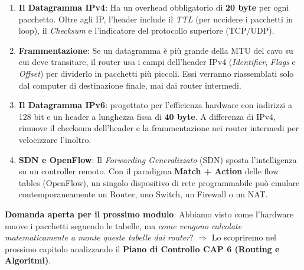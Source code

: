 \documentclass[a4paper,12pt]{report}
\begin{document}
\begin{tcolorbox}[colback=unibolight, colframe=uniboblue, title=\bfseries Concetti chiave del Capitolo 5 (Data Plane), breakable]
\begin{enumerate}
    \item \textbf{Il Datagramma IPv4}: Ha un overhead obbligatorio di \textbf{20 byte} per ogni pacchetto. Oltre agli IP, l'header include il \textit{TTL} (per uccidere i pacchetti in loop), il \textit{Checksum} e l'indicatore del protocollo superiore (TCP/UDP).
    
    \item \textbf{Frammentazione}: Se un datagramma è più grande della MTU del cavo su cui deve transitare, il router usa i campi dell'header IPv4 (\textit{Identifier}, \textit{Flags} e \textit{Offset}) per dividerlo in pacchetti più piccoli. Essi verranno riassemblati solo dal computer di destinazione finale, mai dai router intermedi.

    \item \textbf{Il Datagramma IPv6}: progettato per l'efficienza hardware con indirizzi a 128 bit  e un header a lunghezza fissa di \textbf{40 byte}. A differenza di IPv4, rimuove il checksum dell'header e la frammentazione nei router intermedi per velocizzare l'inoltro.
    
    \item \textbf{SDN e OpenFlow}: Il \textit{Forwarding Generalizzato} (SDN) sposta l'intelligenza su un controller remoto. Con il paradigma \textbf{Match + Action} delle flow tables (OpenFlow), un singolo dispositivo di rete programmabile può emulare contemporaneamente un Router, uno Switch, un Firewall o un NAT.
\end{enumerate}

\vspace{0.3cm}
\textbf{Domanda aperta per il prossimo modulo}: Abbiamo visto come l'hardware muove i pacchetti seguendo le tabelle, ma \textit{come vengono calcolate matematicamente a monte queste tabelle dai router}? $\Rightarrow$ Lo scopriremo nel prossimo capitolo analizzando il \textbf{Piano di Controllo  CAP 6 (Routing e Algoritmi)}.
\end{tcolorbox}
\end{document}
